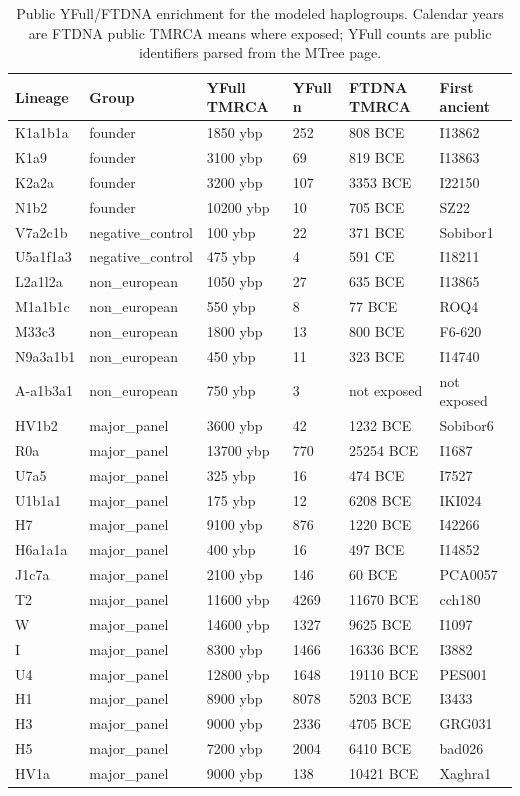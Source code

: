 \documentclass[11pt]{article}
\begin{document}
\begin{table}[htbp]
\centering
\scriptsize
\caption{Public YFull/FTDNA enrichment for the modeled haplogroups. Calendar years are FTDNA public TMRCA means where exposed; YFull counts are public identifiers parsed from the MTree page.}
\label{tab:public-enrichment}
\begin{tabular}{llllll}
\toprule
Lineage & Group & YFull TMRCA & YFull n & FTDNA TMRCA & First ancient \\
\midrule
K1a1b1a & founder & 1850 ybp & 252 & 808 BCE & I13862 \\
K1a9 & founder & 3100 ybp & 69 & 819 BCE & I13863 \\
K2a2a & founder & 3200 ybp & 107 & 3353 BCE & I22150 \\
N1b2 & founder & 10200 ybp & 10 & 705 BCE & SZ22 \\
V7a2c1b & negative\_control & 100 ybp & 22 & 371 BCE & Sobibor1 \\
U5a1f1a3 & negative\_control & 475 ybp & 4 & 591 CE & I18211 \\
L2a1l2a & non\_european & 1050 ybp & 27 & 635 BCE & I13865 \\
M1a1b1c & non\_european & 550 ybp & 8 & 77 BCE & ROQ4 \\
M33c3 & non\_european & 1800 ybp & 13 & 800 BCE & F6-620 \\
N9a3a1b1 & non\_european & 450 ybp & 11 & 323 BCE & I14740 \\
A-a1b3a1 & non\_european & 750 ybp & 3 & not exposed & not exposed \\
HV1b2 & major\_panel & 3600 ybp & 42 & 1232 BCE & Sobibor6 \\
R0a & major\_panel & 13700 ybp & 770 & 25254 BCE & I1687 \\
U7a5 & major\_panel & 325 ybp & 16 & 474 BCE & I7527 \\
U1b1a1 & major\_panel & 175 ybp & 12 & 6208 BCE & IKI024 \\
H7 & major\_panel & 9100 ybp & 876 & 1220 BCE & I42266 \\
H6a1a1a & major\_panel & 400 ybp & 16 & 497 BCE & I14852 \\
J1c7a & major\_panel & 2100 ybp & 146 & 60 BCE & PCA0057 \\
T2 & major\_panel & 11600 ybp & 4269 & 11670 BCE & cch180 \\
W & major\_panel & 14600 ybp & 1327 & 9625 BCE & I1097 \\
I & major\_panel & 8300 ybp & 1466 & 16336 BCE & I3882 \\
U4 & major\_panel & 12800 ybp & 1648 & 19110 BCE & PES001 \\
H1 & major\_panel & 8900 ybp & 8078 & 5203 BCE & I3433 \\
H3 & major\_panel & 9000 ybp & 2336 & 4705 BCE & GRG031 \\
H5 & major\_panel & 7200 ybp & 2004 & 6410 BCE & bad026 \\
HV1a & major\_panel & 9000 ybp & 138 & 10421 BCE & Xaghra1 \\
\bottomrule
\end{tabular}
\end{table}
\end{document}
